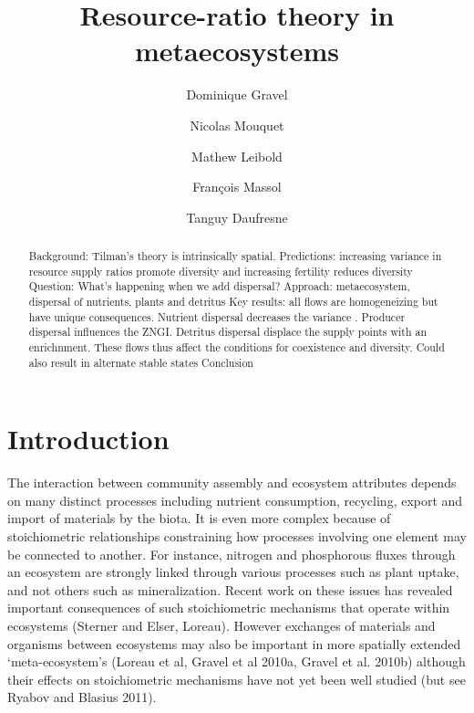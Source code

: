 \documentclass[letterpaper,twocolumn,showkeys]{revtex4-1}
\begin{document}
\title{Resource-ratio theory in metaecosystems}

\author{Dominique Gravel}
\author{Nicolas Mouquet}
\author{Mathew Leibold}
\author{François Massol}
\author{Tanguy Daufresne}

\begin{abstract}
Background: Tilman's theory is intrinsically spatial. Predictions: increasing variance in resource supply ratios promote diversity and increasing fertility reduces diversity 
Question: What's happening when we add dispersal?
Approach: metaecosystem, dispersal of nutrients, plants and detritus
Key results: all flows are homogeneizing but have unique consequences. Nutrient dispersal decreases the variance . Producer dispersal influences the ZNGI. Detritus dispersal displace the supply points with an enrichnment. These flows thus affect the conditions for coexistence and diversity. Could also result in alternate stable states
Conclusion
\end{abstract}


\maketitle

\section{Introduction}

The interaction between community assembly and ecosystem attributes depends on many distinct processes including nutrient consumption, recycling, export and import of materials by the biota.  It is even more complex because of stoichiometric relationships constraining how processes involving one element may be connected to another. For instance, nitrogen and phosphorous fluxes through an ecosystem are strongly linked through various processes such as plant uptake, and not others such as mineralization. Recent work on these issues has revealed important consequences of such stoichiometric mechanisms that operate within ecosystems (Sterner and Elser, Loreau).  However exchanges of materials and organisms between ecosystems may also be important in more spatially extended ‘meta-ecosystem’s (Loreau et al, Gravel et al 2010a, Gravel et al. 2010b) although their effects on stoichiometric mechanisms have not yet been well studied (but see Ryabov and Blasius 2011).
\end{document}
